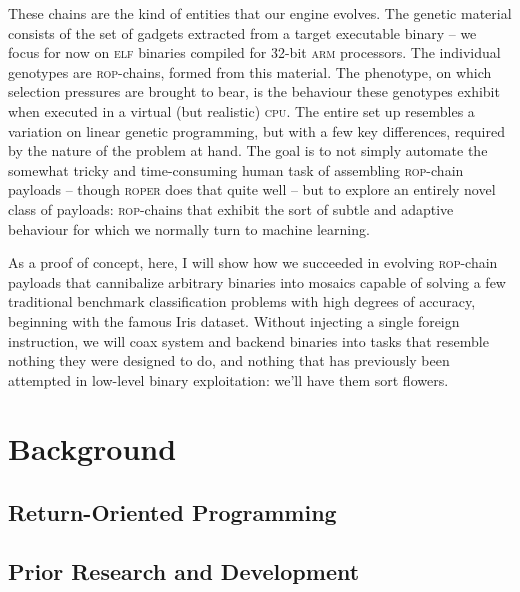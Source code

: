 These chains are the kind of entities that our engine evolves. The
genetic material consists of the set of gadgets extracted from
a target executable binary -- we focus for now on \textsc{elf}
binaries compiled for 32-bit \textsc{arm} processors. The
individual genotypes are \textsc{rop}-chains, formed from this
material. The phenotype, on which selection pressures are brought
to bear, is the behaviour these genotypes exhibit when executed
in a virtual (but realistic) \textsc{cpu}. The entire set up
resembles a variation on linear genetic programming, but with a
few key differences, required by the nature of the problem at
hand. The goal is to not simply automate the somewhat tricky and
time-consuming human task of assembling \textsc{rop}-chain
payloads -- though \textsc{roper} does that quite well -- but to
explore an entirely novel class of payloads: \textsc{rop}-chains
that exhibit the sort of subtle and adaptive behaviour for which
we normally turn to machine learning. 

As a proof of concept, here, I will show how we succeeded in
evolving \textsc{rop}-chain payloads that cannibalize arbitrary
binaries into mosaics capable of solving a few traditional
benchmark classification problems with high degrees of accuracy,
beginning with the famous Iris dataset. Without injecting a
single foreign instruction, we will coax system and backend
binaries into tasks that resemble nothing they were designed to
do, and nothing that has previously been attempted in low-level
binary exploitation: we'll have them sort flowers.
\section{Background}

\subsection{Return-Oriented Programming}

\subsection{Prior Research and Development}


